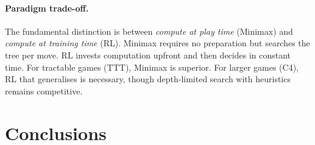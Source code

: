\documentclass[12pt, a4paper]{article}
\begin{document}
\paragraph{Paradigm trade-off.}
The fundamental distinction is between \textit{compute at play time} (Minimax) and
\textit{compute at training time} (RL). Minimax requires no preparation but searches the tree
per move. RL invests computation upfront and then decides in constant time. For tractable games
(TTT), Minimax is superior. For larger games (C4), RL that generalises is necessary, though
depth-limited search with heuristics remains competitive.


\section{Conclusions}

\end{document}
